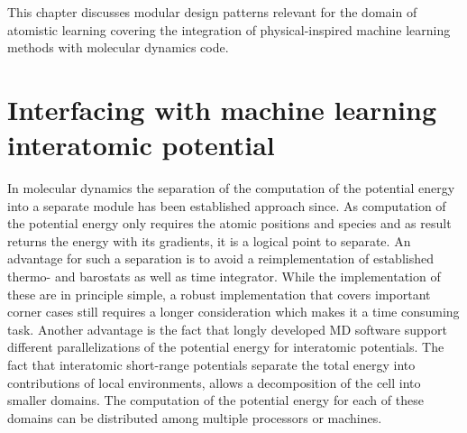 This chapter discusses modular design patterns relevant for the domain of atomistic learning covering the integration of physical-inspired machine learning methods with molecular dynamics code.


\section{Interfacing with machine learning interatomic potential}
In molecular dynamics the separation of the computation of the potential energy into a separate module has been established approach since\cite{TODOLAMMPSv1GROMACSv1}.
As computation of the potential energy only requires the atomic positions and species and as result returns the energy with its gradients, it is a logical point to separate.
An advantage for such a separation is to avoid a reimplementation of established thermo- and barostats as well as time integrator.
While the implementation of these are in principle simple, a robust implementation that covers important corner cases still requires a longer consideration which makes it a time consuming task.
Another advantage is the fact that longly developed MD software support different parallelizations of the potential energy for interatomic potentials.
The fact that interatomic short-range potentials separate the total energy into contributions of local environments, allows a decomposition of the cell into smaller domains.
The computation of the potential energy for each of these domains can be distributed among multiple processors or machines.

